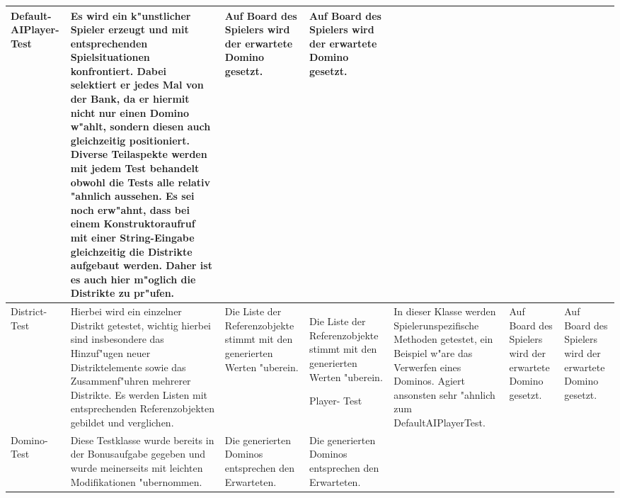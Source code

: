 \begin{tabular}{|p{1.5cm}|p{7.5cm}|p{2cm}|p{2cm}|}
 	\hline 
	
	Default- \newline AIPlayer- \newline Test
	& Es wird ein k"unstlicher Spieler erzeugt und mit entsprechenden Spielsituationen konfrontiert. Dabei selektiert er jedes Mal von der Bank, da er hiermit nicht nur einen Domino w"ahlt, sondern diesen auch gleichzeitig positioniert. Diverse Teilaspekte werden mit jedem Test behandelt obwohl die Tests alle relativ "ahnlich aussehen. Es sei noch erw"ahnt, dass bei einem Konstruktoraufruf mit einer String-Eingabe gleichzeitig die Distrikte aufgebaut werden. Daher ist es auch hier m"oglich die Distrikte zu pr"ufen. 
	& Auf Board des Spielers wird der erwartete Domino gesetzt. 
	& Auf Board des Spielers wird der erwartete Domino gesetzt. \\
	
	\hline 
 	
 	District- \newline Test
	& Hierbei wird ein einzelner Distrikt getestet, wichtig hierbei sind insbesondere das Hinzuf"ugen neuer Distriktelemente sowie das Zusammenf"uhren mehrerer Distrikte. Es werden Listen mit entsprechenden Referenzobjekten gebildet und verglichen. 
	& Die Liste der Referenzobjekte stimmt mit den generierten Werten "uberein. 
	& Die Liste der Referenzobjekte stimmt mit den generierten Werten "uberein. 
	
	\hline 
 	
	Player- \newline Test
	& In dieser Klasse werden Spielerunspezifische Methoden getestet, ein Beispiel w"are das Verwerfen eines Dominos. Agiert ansonsten sehr "ahnlich zum DefaultAIPlayerTest. 
	& Auf Board des Spielers wird der erwartete Domino gesetzt. 
	& Auf Board des Spielers wird der erwartete Domino gesetzt. \\
	
	\hline 
	
	Domino- \newline Test
	& Diese Testklasse wurde bereits in der Bonusaufgabe gegeben und wurde meinerseits mit leichten Modifikationen "ubernommen. 
	& Die generierten Dominos entsprechen den Erwarteten. 
	& Die generierten Dominos entsprechen den Erwarteten. \\
 	
	\hline
\end{tabular}

